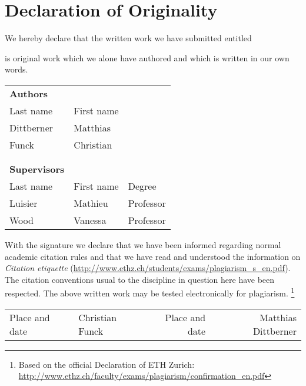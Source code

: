 \chapter{Declaration of Originality}

	We hereby declare that the written work we have submitted entitled
	
	\vspace{0.5cm}
	
	{\bf \hspace{0.5cm} \trtitle}
	
	\vspace{0.5cm}
	
	is original work which we alone have authored and which is written in our own words.
	
	\vspace{1cm}
	
	\hspace{0.5cm} 
	\begin{tabular}{lll}
		{\bf Authors}				&											&									\\
		{\sc Last name}			&	{\sc First name}		&									\\
		Dittberner					& Matthias						&									\\
		Funck								&	Christian						&									\\
		\\
		\\
		{\bf Supervisors}		&											&									\\
		{\sc Last name}			&	{\sc First name}		& {\sc Degree}		\\
		Luisier							&	Mathieu							& Professor				\\
		Wood								&	Vanessa							& Professor
	\end{tabular}
	
	\vspace{1cm}
	
	With the signature we declare that we have been informed regarding normal academic
	citation rules and that we have read and understood the information on {\it Citation etiquette}
	(\url{http://www.ethz.ch/students/exams/plagiarism_s_en.pdf}). The citation conventions
	usual to the discipline in question	here have been respected.
	The above written work may be tested electronically for plagiarism.
	\footnote{Based on the official Declaration of ETH Zurich:
	\url{http://www.ethz.ch/faculty/exams/plagiarism/confirmation_en.pdf}}
	
	\vspace{3.5cm}
	
	\begin{tabular*}{\textwidth}{@{\extracolsep{\fill}} lclcrcr}
		Place and date & \hspace{0.5cm} & Christian Funck	& \hspace{2.5cm} &	Place and date	& \hspace{0.5cm} & Matthias Dittberner	
	\end{tabular*}
